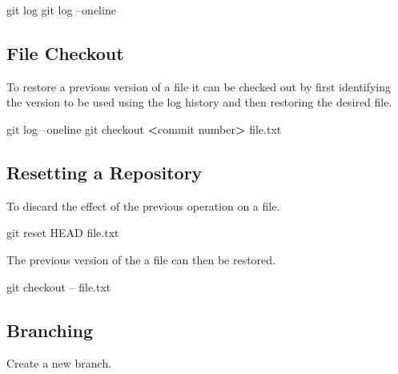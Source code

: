 \documentclass[]{book}
\newenvironment{Shaded}{\begin{snugshade}}{\end{snugshade}}
\newcommand{\FunctionTok}[1]{\textcolor[rgb]{0.00,0.00,0.00}{#1}}
\newcommand{\OperatorTok}[1]{\textcolor[rgb]{0.81,0.36,0.00}{\textbf{#1}}}
\newcommand{\NormalTok}[1]{#1}
\begin{document}
\begin{Shaded}
\begin{Highlighting}[]
\FunctionTok{git}\NormalTok{ log}
\FunctionTok{git}\NormalTok{ log --oneline}
\end{Highlighting}
\end{Shaded}

\subsection{File Checkout}\label{file-checkout}

To restore a previous version of a file it can be checked out by first
identifying the version to be used using the log history and then
restoring the desired file.

\begin{Shaded}
\begin{Highlighting}[]
\FunctionTok{git}\NormalTok{ log --oneline}
\FunctionTok{git}\NormalTok{ checkout }\OperatorTok{<}\NormalTok{commit number}\OperatorTok{>}\NormalTok{ file.txt}
\end{Highlighting}
\end{Shaded}

\subsection{Resetting a Repository}\label{resetting-a-repository}

To discard the effect of the previous operation on a file.

\begin{Shaded}
\begin{Highlighting}[]
\FunctionTok{git}\NormalTok{ reset HEAD file.txt}
\end{Highlighting}
\end{Shaded}

The previous version of the a file can then be restored.

\begin{Shaded}
\begin{Highlighting}[]
\FunctionTok{git}\NormalTok{ checkout -- file.txt}
\end{Highlighting}
\end{Shaded}

\subsection{Branching}\label{branching}

Create a new branch.
\end{document}
